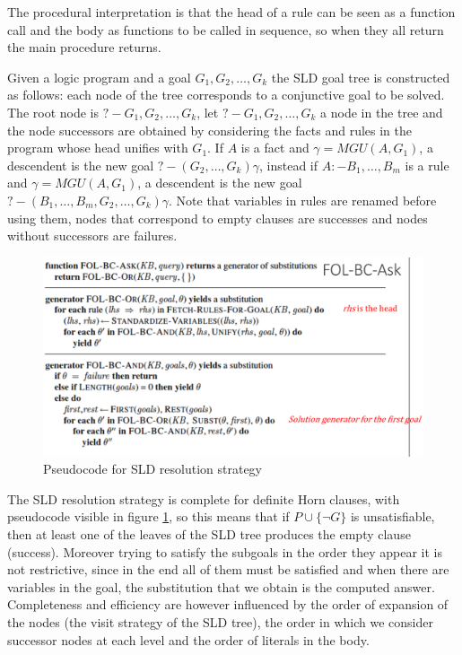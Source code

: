 The procedural interpretation is that the head of a rule can be seen as a function call
and the body as functions to be called in sequence, so when they all return
the main procedure returns.

Given a logic program and a goal $G_1, G_2, \dots, G_k$ the SLD goal tree is constructed
as follows: each node of the tree corresponds to a conjunctive goal to be solved.\newline
The root node is $?- G_1, G_2, \dots, G_k$, let $?- G_1, G_2, \dots, G_k$ a node in the tree
and the node successors are obtained by considering the facts and rules in the program
whose head unifies with $G_1$.\newline
If $A$ is a fact and $\gamma = MGU(A, G_1)$, a descendent is the new goal
$?- (G_2, \dots, G_k)\gamma$, instead if $A :- B_1, \dots, B_m$ is a rule and 
$\gamma = MGU(A, G_1)$, a descendent is the new goal 
$?- (B_1, \dots, B_m, G_2, \dots, G_k)\gamma$.
Note that variables in rules are renamed before using them, nodes that correspond
to empty clauses are successes and nodes without successors are failures.

\begin{figure}
	\includegraphics[width=\textwidth]{Images/sldPseudo}
	\caption{Pseudocode for SLD resolution strategy}
	\label{img:backward}
\end{figure}
The SLD resolution strategy is complete for definite Horn clauses, with pseudocode visible
in figure \ref{img:backward}, so this means that if $P \cup \{\neg G \}$ is unsatisfiable,
then at least one of the leaves of the SLD tree produces the empty clause (success).\newline
Moreover trying to satisfy the subgoals in the order they appear it is not
restrictive, since in the end all of them must be satisfied and when there are variables
in the goal, the substitution that we obtain is the computed answer.\newline
Completeness and efficiency are however influenced by the order of expansion of the nodes
(the visit strategy of the SLD tree), the order in which we consider successor nodes at
each level and the order of literals in the body.

